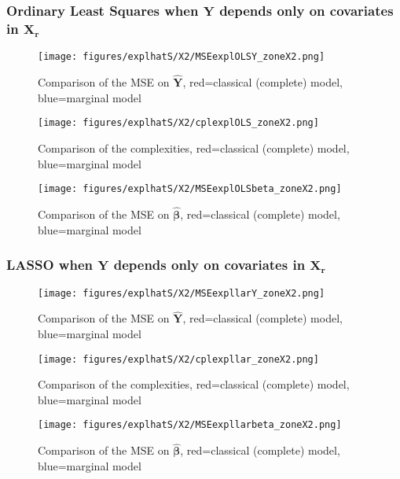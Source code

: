 \documentclass[12pt,a4paper]{report}
\begin{document}
\FloatBarrier

\newpage
\subsubsection{Ordinary Least Squares when $\boldsymbol{Y}$ depends only on covariates in $\boldsymbol{X_r}$}

	\begin{figure}[h!]
	\centering
		  \texttt{[image: figures/explhatS/X2/MSEexplOLSY\_zoneX2.png]}
		\caption{Comparison of the MSE on $\hat{\boldsymbol{Y}}$, red=classical (complete) model, blue=marginal model}\label{MSEexplOLSY_zoneX2}
	\end{figure}
	\begin{figure}[h!]
	\centering
		  \texttt{[image: figures/explhatS/X2/cplexplOLS\_zoneX2.png]}
		\caption{Comparison of the complexities, red=classical (complete) model, blue=marginal model}\label{cplexplOLS_zoneX2}
	\end{figure}
	\begin{figure}[h!]
	\centering
		  \texttt{[image: figures/explhatS/X2/MSEexplOLSbeta\_zoneX2.png]}
		\caption{Comparison of the MSE on $\hat{\boldsymbol{\beta}}$, red=classical (complete) model, blue=marginal model}\label{MSEexplOLSbeta_zoneX2}
	\end{figure}
	\FloatBarrier
\newpage
\subsubsection{LASSO when $\boldsymbol{Y}$ depends only on covariates in $\boldsymbol{X_r}$}

	\begin{figure}[h!]
	\centering
		  \texttt{[image: figures/explhatS/X2/MSEexpllarY\_zoneX2.png]}
		\caption{Comparison of the MSE on $\hat{\boldsymbol{Y}}$, red=classical (complete) model, blue=marginal model}\label{MSEexpllarY_zoneX2}
	\end{figure}
	\begin{figure}[h!]
	\centering
		  \texttt{[image: figures/explhatS/X2/cplexpllar\_zoneX2.png]}
		\caption{Comparison of the complexities, red=classical (complete) model, blue=marginal model}\label{cplexpllar_zoneX2}
	\end{figure}
	\begin{figure}[h!]
	\centering
		  \texttt{[image: figures/explhatS/X2/MSEexpllarbeta\_zoneX2.png]}
		\caption{Comparison of the MSE on $\hat{\boldsymbol{\beta}}$, red=classical (complete) model, blue=marginal model}\label{MSEexpllarbeta_zoneX2}
	\end{figure}
	\FloatBarrier
\newpage
\end{document}
